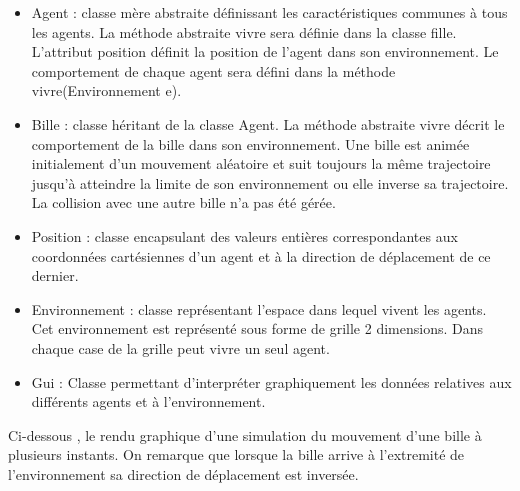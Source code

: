 \documentclass[a4paper,12pt]{report}
\begin{document}
\begin{itemize}
\item Agent : classe mère abstraite définissant les caractéristiques communes à tous les agents. La méthode abstraite vivre sera définie dans la classe fille. L'attribut position définit la position de l'agent dans son environnement. Le comportement de chaque agent sera défini dans la méthode vivre(Environnement e).

\item Bille : classe héritant de la classe Agent. La méthode abstraite vivre décrit le comportement de la bille dans son environnement.  Une bille est animée initialement d'un mouvement aléatoire et suit toujours la même trajectoire jusqu'à atteindre la limite de son environnement ou elle inverse sa trajectoire. La collision avec une autre bille n'a pas été gérée.

\item Position : classe encapsulant des valeurs entières correspondantes aux coordonnées cartésiennes d'un agent et à la direction de déplacement de ce dernier.

\item Environnement : classe représentant l'espace dans lequel vivent les agents. Cet environnement est représenté sous forme de grille  2 dimensions. Dans chaque case de la grille peut vivre un seul agent.

\item Gui : Classe permettant d'interpréter graphiquement les données relatives aux différents agents et à l'environnement.
\end{itemize}
\noindent Ci-dessous , le rendu graphique d'une simulation du mouvement d'une bille à plusieurs instants. On remarque que lorsque la bille arrive à l'extremité de l'environnement sa direction de déplacement est inversée.
\end{document}
